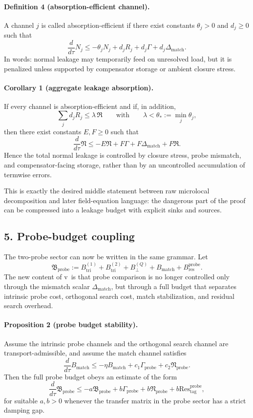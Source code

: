 \paragraph{Definition 4 (absorption-efficient channel).}
A channel $j$ is called absorption-efficient if there exist constants
$\theta_j>0$ and $d_j\ge0$ such that
\[
\frac{d}{d\tau}N_j
\le -\theta_j N_j + d_j R_j + d_j\Gamma + d_j\Delta_{\mathrm{match}}.
\]
In words: normal leakage may temporarily feed on unresolved load, but it is
penalized unless supported by compensator storage or ambient closure stress.

\paragraph{Corollary 1 (aggregate leakage absorption).}
If every channel is absorption-efficient and if, in addition,
\[
\sum_j d_j R_j \le \lambda\,\mathfrak R
\qquad\text{with}\qquad
\lambda<\theta_*:=\min_j\theta_j,
\]
then there exist constants $E,F\ge0$ such that
\[
\frac{d}{d\tau}\mathfrak N
\le -E\mathfrak N + F\Gamma + F\Delta_{\mathrm{match}} + F\mathfrak R.
\]
Hence the total normal leakage is controlled by closure stress, probe mismatch,
and compensator-facing storage, rather than by an uncontrolled accumulation of
termwise errors.

This is exactly the desired middle statement between raw microlocal decomposition
and later field-equation language: the dangerous part of the proof can be
compressed into a leakage budget with explicit sinks and sources.

\subsection*{5. Probe-budget coupling}
The two-probe sector can now be written in the same grammar. Let
\[
\mathfrak B_{\mathrm{probe}}:=
B_{\mathrm{tri}}^{(1)}+B_{\mathrm{tri}}^{(2)}+B_{\perp}^{(Q)}+B_{\mathrm{match}}+B_{\mathrm{res}}^{\mathrm{probe}}.
\]
The new content of v\docversion\ is that probe comparison is no longer controlled
only through the mismatch scalar $\Delta_{\mathrm{match}}$, but through a full budget
that separates intrinsic probe cost, orthogonal search cost, match stabilization,
and residual search overhead.

\paragraph{Proposition 2 (probe budget stability).}
Assume the intrinsic probe channels and the orthogonal search channel are
transport-admissible, and assume the match channel satisfies
\[
\frac{d}{d\tau}B_{\mathrm{match}}
\le -\eta B_{\mathrm{match}} + c_1\Gamma_{\mathrm{probe}} + c_2\mathfrak N_{\mathrm{probe}}.
\]
Then the full probe budget obeys an estimate of the form
\[
\frac{d}{d\tau}\mathfrak B_{\mathrm{probe}}
\le -a\mathfrak B_{\mathrm{probe}} + b\Gamma_{\mathrm{probe}} + b\mathfrak N_{\mathrm{probe}} + b\mathrm{Res}^{\mathrm{probe}}_{\mathrm{tag}},
\]
for suitable $a,b>0$ whenever the transfer matrix in the probe sector has a
strict damping gap.

